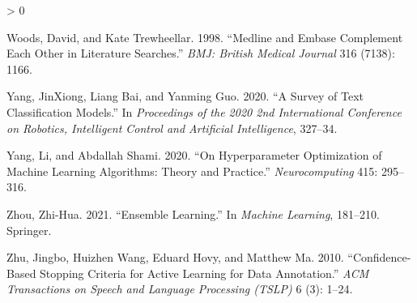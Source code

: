 \documentclass{article}
\newlength{\cslhangindent}
\newenvironment{CSLReferences}[2] %
 {%
  \setlength{\parindent}{0pt}
  \ifodd #1 \everypar{\setlength{\hangindent}{\cslhangindent}}\ignorespaces\fi
  \ifnum #2 > 0
  \setlength{\parskip}{#2\baselineskip}
  \fi
 }%
 {}
\begin{document}
\begin{CSLReferences}{1}{0}
\leavevmode\hypertarget{ref-woods1998medline}{}%
Woods, David, and Kate Trewheellar. 1998. {``Medline and Embase
Complement Each Other in Literature Searches.''} \emph{BMJ: British
Medical Journal} 316 (7138): 1166.

\leavevmode\hypertarget{ref-yang2020survey}{}%
Yang, JinXiong, Liang Bai, and Yanming Guo. 2020. {``A Survey of Text
Classification Models.''} In \emph{Proceedings of the 2020 2nd
International Conference on Robotics, Intelligent Control and Artificial
Intelligence}, 327--34.

\leavevmode\hypertarget{ref-yang2020hyperparameter}{}%
Yang, Li, and Abdallah Shami. 2020. {``On Hyperparameter Optimization of
Machine Learning Algorithms: Theory and Practice.''}
\emph{Neurocomputing} 415: 295--316.

\leavevmode\hypertarget{ref-zhou2021ensemble}{}%
Zhou, Zhi-Hua. 2021. {``Ensemble Learning.''} In \emph{Machine
Learning}, 181--210. Springer.

\leavevmode\hypertarget{ref-zhu2010confidence}{}%
Zhu, Jingbo, Huizhen Wang, Eduard Hovy, and Matthew Ma. 2010.
{``Confidence-Based Stopping Criteria for Active Learning for Data
Annotation.''} \emph{ACM Transactions on Speech and Language Processing
(TSLP)} 6 (3): 1--24.

\end{CSLReferences}



\end{document}

